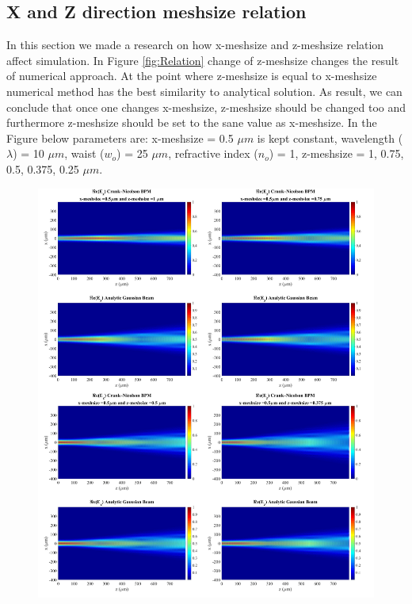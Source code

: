 \documentclass[a4paper]{article}
\begin{document}
	\subsection{X and Z direction meshsize relation}
	In this section we made a research on how x-meshsize and z-meshsize relation affect simulation. In Figure \ref{fig:Relation} change of z-meshsize changes the result of numerical approach. At the point where z-meshsize is equal to x-meshsize numerical method has the best similarity to analytical solution. As result, we can conclude that once one changes x-meshsize, z-meshsize should be changed too and furthermore z-meshsize should be set to the sane value as x-meshsize. In the Figure below parameters are: x-meshsize  = 0.5 $\mu m$ is kept constant, wavelength ($\lambda$) = 10 $\mu m$, waist ($w_o$) = 25 $\mu m$, refractive index ($n_o$) = 1, z-meshsize = 1, 0.75, 0.5, 0.375, 0.25 $\mu m$.
%	
	\begin{figure}[H]
		\hspace{-22.5mm}
		\includegraphics[width=1.35\textwidth]{change1234.jpg}	
	\end{figure}
	
\end{document}
